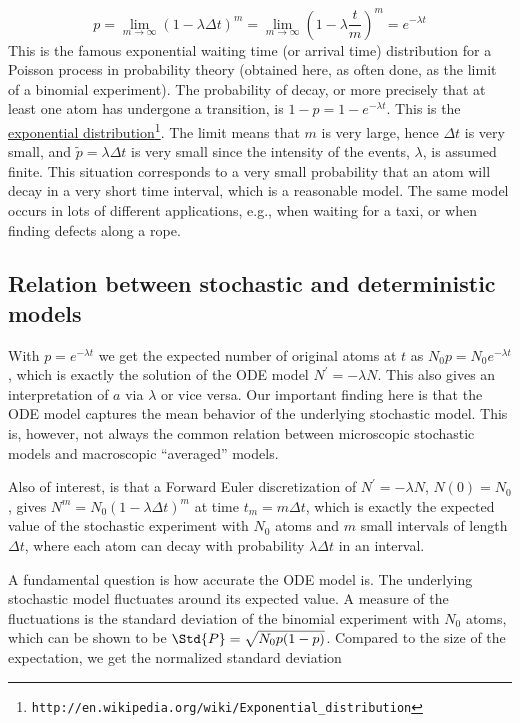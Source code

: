 \documentclass[graybox,sectrefs,envcountresetchap,open=right,final]{svmonodo}
\begin{document}
\[ p = \lim_{m\rightarrow\infty} (1-\lambda\Delta t)^m
= \lim_{m\rightarrow\infty} \left(1-\lambda\frac{t}{m}\right)^m = e^{-\lambda t}
\]
This is the famous exponential waiting time (or arrival time) distribution for a
Poisson process in probability theory (obtained here, as often done, as
the limit of a binomial experiment). The probability of decay, or more
precisely that at least one atom has undergone a transition, is
$1-p= 1-e^{-\lambda t}$. This is the
\href{{http://en.wikipedia.org/wiki/Exponential_distribution}}{exponential distribution}\footnote{\texttt{http://en.wikipedia.org/wiki/Exponential\_distribution}}.
The limit means that $m$ is very
large, hence $\Delta t$ is very small, and $\tilde p=\lambda\Delta t$
is very small since the intensity of the events, $\lambda$, is assumed
finite. This situation corresponds to a very small probability
that an atom will decay in a very short time interval, which is a
reasonable model.
The same model occurs in lots of different applications, e.g.,
when waiting for a taxi, or when finding defects along a rope.

\subsection{Relation between stochastic and deterministic models}

With $p=e^{-\lambda t}$ we get the expected number of original atoms
at $t$ as $N_0p=N_0e^{-\lambda t}$, which is exactly the solution of
the ODE model $N^{\prime}=-\lambda N$. This also gives an interpretation
of $a$ via $\lambda$ or vice versa. Our important finding here
is that the ODE model
captures the mean behavior of the underlying stochastic model. This
is, however, not always the common relation between microscopic stochastic
models and macroscopic ``averaged'' models.

Also of interest, is that a Forward Euler discretization of
$N^{\prime}=-\lambda N$, $N(0)=N_0$, gives $N^m = N_0(1-\lambda\Delta t)^m$
at time $t_m=m\Delta t$, which is exactly the
expected value of the stochastic experiment with $N_0$ atoms
and $m$ small intervals of length $\Delta t$, where each atom can
decay with probability $\lambda\Delta t$ in an interval.

A fundamental question is how accurate the ODE model is. The underlying
stochastic model fluctuates around its expected value. A measure
of the fluctuations is the standard deviation of the binomial experiment with
$N_0$ atoms, which can be shown to be $\Std{P}=\sqrt{N_0p(1-p)}$. Compared
to the size of the expectation, we get
the normalized standard deviation
\end{document}
